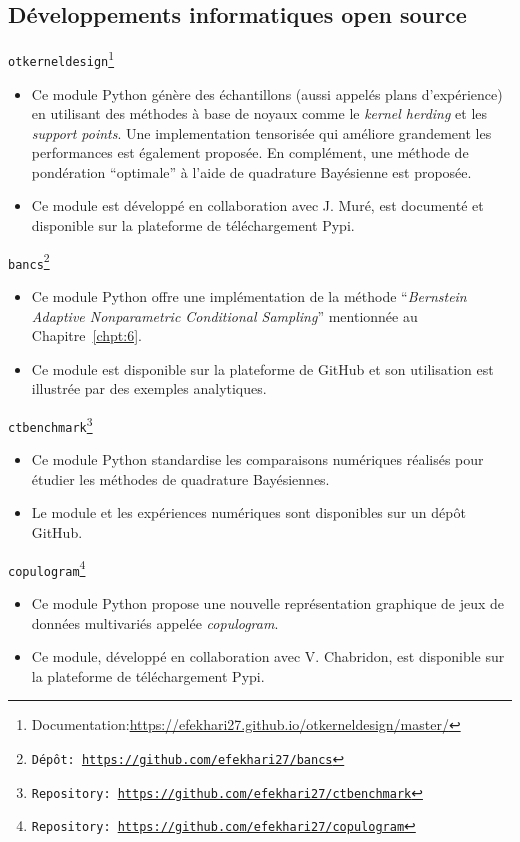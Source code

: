 \newpage
\subsection*{Développements informatiques open source}

\noindent
\texttt{otkerneldesign}\footnote{Documentation:\url{https://efekhari27.github.io/otkerneldesign/master/}}
\begin{itemize}
    \item[\textbullet] Ce module Python génère des échantillons (aussi appelés plans d'expérience) en utilisant des méthodes à base de noyaux comme le \textit{kernel herding} et les \textit{support points}. Une implementation tensorisée qui améliore grandement les performances est également proposée. En complément, une méthode de pondération ``optimale'' à l'aide de quadrature Bayésienne est proposée. 
    \item[\textbullet] Ce module est développé en collaboration avec J. Muré, est documenté et disponible sur la plateforme de téléchargement Pypi.
\end{itemize}

\noindent
\texttt{bancs\footnote{Dépôt: \url{https://github.com/efekhari27/bancs}}}     
\begin{itemize}
    \item[\textbullet] Ce module Python offre une implémentation de la méthode ``\textit{Bernstein Adaptive Nonparametric Conditional Sampling}'' mentionnée au Chapitre~\ref{chpt:6}. 
    \item[\textbullet] Ce module est disponible sur la plateforme de GitHub et son utilisation est illustrée par des exemples analytiques.
\end{itemize}

\noindent
\texttt{ctbenchmark\footnote{Repository: \url{https://github.com/efekhari27/ctbenchmark}}}    
\begin{itemize}
    \item[\textbullet] Ce module Python standardise les comparaisons numériques réalisés pour étudier les méthodes de quadrature Bayésiennes.      
    \item[\textbullet] Le module et les expériences numériques sont disponibles sur un dépôt GitHub.
\end{itemize}

\noindent
\texttt{copulogram\footnote{Repository: \url{https://github.com/efekhari27/copulogram}}} 
\begin{itemize}
    \item[\textbullet] Ce module Python propose une nouvelle représentation graphique de jeux de données multivariés appelée \textit{copulogram}.
    \item[\textbullet] Ce module, développé en collaboration avec V. Chabridon, est disponible sur la plateforme de téléchargement Pypi.
\end{itemize}
